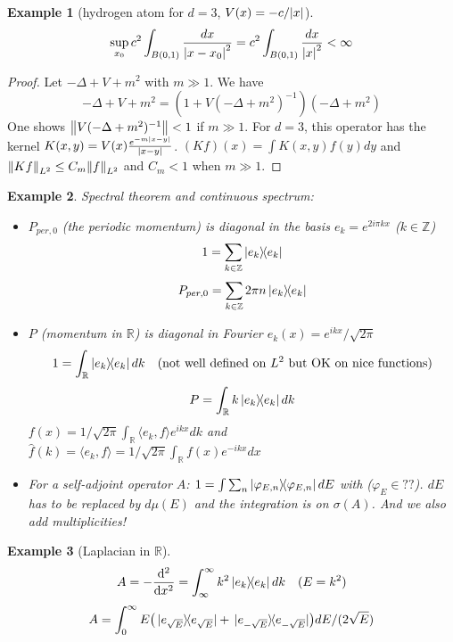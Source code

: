 \documentclass{article}
\newtheorem*{example}{Example}
\newcommand{\ZZ}{\mathbb{Z}}
\newcommand{\RR}{\mathbb{R}}
\newcommand{\sig}{\sigma}
\renewcommand{\sp}[2]{\langle #1,#2 \rangle}
\begin{document}
\begin{example}[hydrogen atom for $d = 3$, $V(x) = -c/\abs{x}$]
  $$ \sup_{x_0} c^2 \int_{B(0,1)} \frac{dx}{\abs{x-x_0}^2} = c^2 \int_{B(0,1)} \frac{dx}{\abs{x}^2} < \infty $$
\end{example}

\begin{proof}
  Let $-\Delta + V +m^2$ with $m \gg 1$. We have
  $$ -\Delta + V +m^2 = (1 + V(-\Delta+m^2)^{-1} ) (-\Delta + m^2) $$
  One shows $\norm{V(-\Delta + m^2)^{-1}} < 1$ if $m \gg 1$.
  For $d = 3$, this operator has the kernel $K(x,y) = V(x) \frac{e^{-m\abs{x-y}}}{\abs{x-y}}$.
  $(Kf)(x) = \int K(x,y) f(y) dy$ and 
  $\norm{Kf}_{L^2} \le C_m \norm{f}_{L^2}$ and $C_m < 1$ when $m \gg 1$.
\end{proof}
  
\begin{example}
  Spectral theorem and continuous spectrum:
  \begin{itemize}
    \item
    $P_{per,0}$ (the periodic momentum) is diagonal in the basis $e_k = e^{2i\pi kx}$ ($k \in \ZZ$)
    $$ 1 = \sum_{k \in \ZZ} \dyad{e_k} $$
    $$ P_{per,0} = \sum_{k \in \ZZ} 2\pi n \dyad{e_k} $$

    \item
    $P$ (momentum in $\RR$) is diagonal in Fourier $e_k(x) = e^{ikx}/\sqrt{2\pi}$
    $$ 1 = \int_\RR   \dyad{e_k} dk  \quad \text{(not well defined on $L^2$ but OK on nice functions)} $$
    $$ P  = \int_\RR k \dyad{e_k} dk $$  
    $f(x) = 1/\sqrt{2\pi} \int_\RR \sp{e_k}{f} e^{ikx} dk$ and
    $\hat{f}(k) = \sp{e_k}{f} =  1/\sqrt{2\pi} \int_{\RR} f(x) e^{-ikx} dx$

    \item
    For a self-adjoint operator $A$:
    $1 = \int \sum_n \dyad{\varphi_{E,n}} dE$ with ($\varphi_E \in ??$). 
    $dE$ has to be replaced by $d\mu(E)$ and the integration is on $\sig(A)$.
    And we also add multiplicities!
  \end{itemize}
\end{example}

\begin{example}[Laplacian in $\RR$]
  $$ A = - \dv[2]{}{x} = \int_\infty^\infty k^2 \dyad{e_k} dk \quad (E = k^2) $$
  $$ A = \int_0^\infty E \qty(\dyad*{e_{\sqrt{E}}} + \dyad*{e_{-\sqrt{E}}}) dE/(2\sqrt{E}) $$
\end{example}
\end{document}
